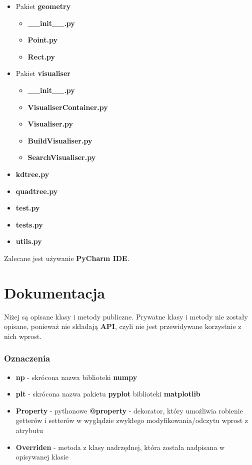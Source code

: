 \documentclass[a4paper, 12pt]{article}
\begin{document}
  \begin{itemize}
      \item Pakiet \textbf{geometry}
      \begin{itemize}
          \item \textbf{\_\_init\_\_.py}
          \item \textbf{Point.py}
          \item \textbf{Rect.py}
      \end{itemize}
      \item Pakiet \textbf{visualiser}
      \begin{itemize}
          \item \textbf{\_\_init\_\_.py}
          \item \textbf{VisualiserContainer.py}
          \item \textbf{Visualiser.py}
          \item \textbf{BuildVisualiser.py}
          \item \textbf{SearchVisualiser.py}
      \end{itemize}
      \item \textbf{kdtree.py}
      \item \textbf{quadtree.py}
      \item \textbf{test.py}
      \item \textbf{tests.py}
      \item \textbf{utils.py}
  \end{itemize}

  \noindent
  \quad Zalecane jest używanie \textbf{PyCharm IDE}.

\newpage
\part{Dokumentacja}
  \quad Niżej są opisane klasy i metody publiczne. Prywatne klasy i metody nie zostały opisane, ponieważ nie składają \textbf{API}, czyli nie jest przewidywane korzystnie z nich wprost.

  \section{Oznaczenia}
    \begin{itemize}
        \item \textbf{np} - skrócona nazwa biblioteki \textbf{numpy}
        \item \textbf{plt} - skrócona nazwa pakietu \textbf{pyplot} biblioteki \textbf{matplotlib}
        \item \textbf{Property} - pythonowe \textbf{@property} - dekorator, który umożliwia robienie getterów i setterów w wyglądzie zwykłego modyfikowania/odczytu wprost z atrybutu
        \item \textbf{Overriden} - metoda z klasy nadrzędnej, która została nadpisana w opisywanej klasie
    \end{itemize}
\end{document}
